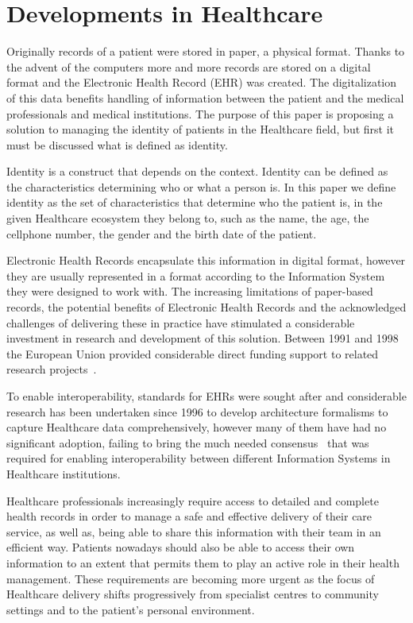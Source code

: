 \section{Developments in Healthcare}\label{blockchainHealthcare}

Originally records of a patient were stored in paper, a physical format.
Thanks to the advent of the computers more and more records are stored on a
digital format and the Electronic Health Record (EHR) was created.
\cite{Marquez2017}  The digitalization of this data benefits handling of
information between the patient and the medical professionals and medical
institutions\cite{ONCoordinator2017}.  The purpose of this paper is proposing a
solution to managing the identity of patients in the Healthcare field, but
first it must be discussed what is defined as identity.

Identity is a construct that depends on the context. Identity can be defined as
the characteristics determining who or what a person is. In this paper we
define identity as the set of characteristics that determine who the patient is,
in the given Healthcare ecosystem they belong to, such as the name, the age,
the cellphone number, the gender and the birth date of the patient.  

Electronic Health Records encapsulate this information in digital format,
however they are usually represented in a format according to the Information
System they were designed to work with. The increasing limitations of
paper-based records, the potential benefits of Electronic Health Records and
the acknowledged challenges of delivering these in practice have stimulated a
considerable investment in research and development of this solution.
Between 1991 and 1998 the European Union provided considerable direct funding
support to related research projects~\cite{Kalra2006}.

To enable interoperability, standards for EHRs were sought after and
considerable research has been undertaken since 1996 to develop architecture
formalisms to capture Healthcare data comprehensively, however many of them
have had no significant adoption, failing to bring the much needed
consensus~\cite{Eichelberg2006} that was required for enabling interoperability
between different Information Systems in Healthcare institutions. 

Healthcare professionals increasingly require access to detailed and complete
health records in order to manage a safe and effective delivery of their care
service, as well as, being able to share this information with their team in an
efficient way. Patients nowadays should also be able to access their own
information to an extent that permits them to play an active role in their
health management. These requirements are becoming more urgent as the focus of
Healthcare delivery shifts progressively from specialist centres to community
settings and to the patient’s personal environment.


